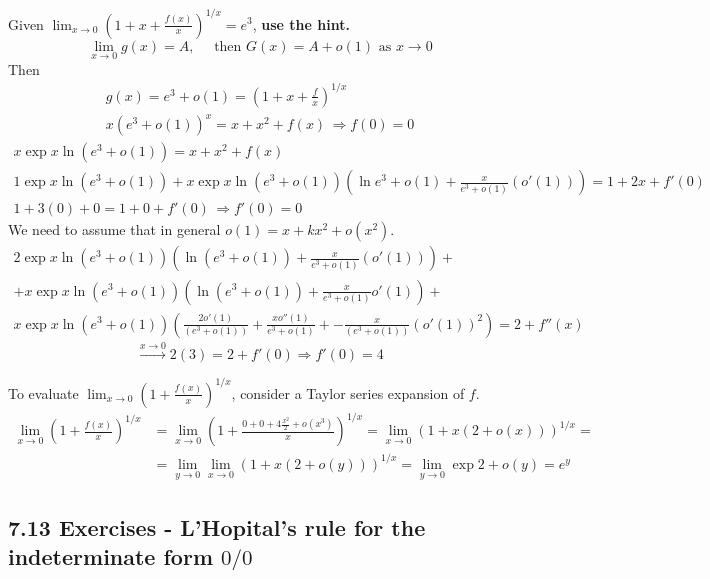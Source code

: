 \documentclass[twoside]{amsart}
\theoremstyle{plain}
\theoremstyle{definition}
\newcommand{\exercisehead}[1]
  {\smallskip
   \noindent{\small\bf Exercise #1.}}
\begin{document}
\exercisehead{33} Given $\lim_{x\to 0} \left( 1 + x + \frac{f(x)}{x} \right)^{1/x} = e^3$, \textbf{ use the hint.}  
\[
\lim_{x\to 0} g(x) = A, \quad \text{ then $G(x) = A + o(1) $ as $x\to 0 $} 
\]
Then
\[
\begin{gathered}
  g(x) = e^3 + o(1) = \left( 1 + x + \frac{f}{x} \right)^{1/x} \\
  x \left( e^3 + o(1) \right)^x = x + x^2 + f(x) \, \Longrightarrow \boxed{ f(0) = 0 }   
\end{gathered}
\]
\[
\begin{gathered}
  x \exp{ x \ln{ (e^3 + o(1) )} } = x + x^2 + f(x) \\
  1 \exp{ x \ln{ (e^3 + o(1) )} } + x \exp{ x \ln{ (e^3 + o(1) )} } \left( \ln{e^3 + o(1)} + \frac{ x }{ e^3 + o(1)} (o'(1)) \right) = 1 + 2x + f'(0) \\
  1 + 3(0) + 0 = 1 + 0 + f'(0) \, \Longrightarrow f'(0) = 0 
\end{gathered}
\]
We need to assume that in general $o(1) = x + kx^2 + o(x^2)$.  
\begin{multline*}
  2 \exp{ x \ln{ (e^3 + o(1) )} } \left( \ln{ (e^3 + o(1) ) } + \frac{ x}{ e^3 + o(1)} (o'(1)) \right) + \\ 
  + x \exp{ x \ln{ (e^3 + o(1) )} } \left( \ln{ (e^3 + o(1))} + \frac{x}{e^3 + o(1)} o'(1) \right) + \\
  x\exp{ x \ln{ (e^3 + o(1) )} } \left( \frac{2 o'(1)}{ (e^3 + o(1)) } + \frac{ x o''(1)}{ e^3 + o(1) } + - \frac{x}{ (e^3 + o(1)) } (o'(1))^2 \right) = 2 + f''(x)  
\end{multline*}
\[
\xrightarrow{x\to 0} 2(3) = 2 + f'(0) \Longrightarrow f'(0) = 4 
\]

To evaluate $\lim_{x \to 0 } \left( 1 + \frac{f(x)}{ x } \right)^{1/x}$, consider a Taylor series expansion of $f$.  
\[
\begin{aligned}
  \lim_{x \to 0 } \left( 1 + \frac{f(x)}{ x } \right)^{1/x} & = \lim_{x \to 0 } \left( 1 + \frac{ 0 + 0 + 4 \frac{x^2}{2} + o(x^3)   }{ x } \right)^{1/x} = \lim_{x \to 0 } \left( 1 + x \left( 2 + o(x) \right)  \right)^{1/x} = \\
  & = \lim_{y\to 0} \lim_{x\to 0} \left( 1 + x \left( 2+o(y) \right) \right)^{1/x} = \lim_{y\to 0} \exp{ 2 + o(y)} = e^y
\end{aligned}
\]

\subsection*{ 7.13 Exercises - L'Hopital's rule for the indeterminate form $0/0$ }
\end{document}
